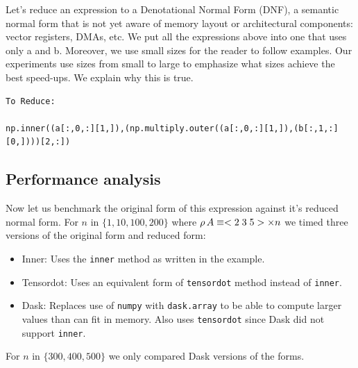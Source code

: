 \documentclass[a4paper,12pt]{article}
\begin{document}
Let's reduce an expression to
a Denotational Normal Form (DNF), a semantic normal form that is not yet aware of memory layout or architectural components: vector registers, DMAs, etc.
We put all the expressions above into one that uses only a and b.
Moreover, we use small sizes for the reader to follow examples. Our experiments
use sizes from small to large to emphasize what sizes achieve the best speed-ups. We
explain why this is true.
\begin{verbatim}
To Reduce:

np.inner((a[:,0,:][1,]),(np.multiply.outer((a[:,0,:][1,]),(b[:,1,:][0,])))[2,:])

\end{verbatim}
  
  
\subsection{Performance analysis}

Now let us benchmark the original form of this expression against it's reduced normal form.
For $n$ in ${\{1, 10, 100, 200\}}$ where $\rho\, A \equiv <2\;3\;5> \times n$ we timed three
versions of the original form and reduced form:

\begin{itemize}
  \item Inner: Uses the \verb|inner| method as written in the example.
  \item Tensordot: Uses an equivalent form of \verb|tensordot| method instead of \verb|inner|.
  \item Dask: Replaces use of \verb|numpy| with \verb|dask.array| to be able to compute larger values than can fit in memory. Also
  uses \verb|tensordot| since Dask did not support \verb|inner|. 
\end{itemize}

For $n$ in ${\{300, 400, 500\}}$ we only compared Dask versions of the forms.
\end{document}
